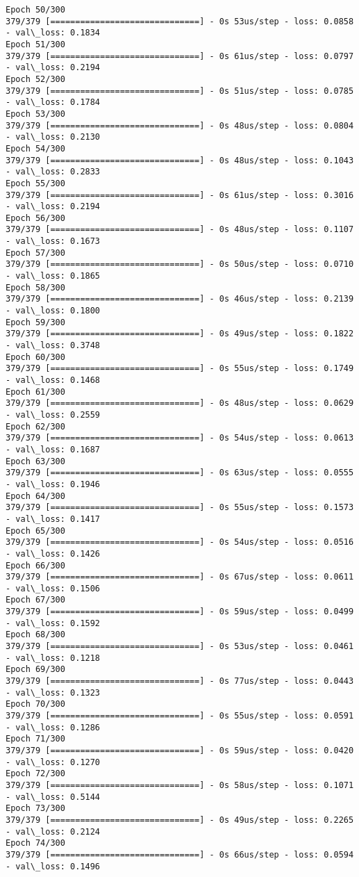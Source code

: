 \documentclass[11pt]{article}
\begin{document}
\begin{Verbatim}[commandchars=\\\{\}]
Epoch 50/300
379/379 [==============================] - 0s 53us/step - loss: 0.0858 - val\_loss: 0.1834
Epoch 51/300
379/379 [==============================] - 0s 61us/step - loss: 0.0797 - val\_loss: 0.2194
Epoch 52/300
379/379 [==============================] - 0s 51us/step - loss: 0.0785 - val\_loss: 0.1784
Epoch 53/300
379/379 [==============================] - 0s 48us/step - loss: 0.0804 - val\_loss: 0.2130
Epoch 54/300
379/379 [==============================] - 0s 48us/step - loss: 0.1043 - val\_loss: 0.2833
Epoch 55/300
379/379 [==============================] - 0s 61us/step - loss: 0.3016 - val\_loss: 0.2194
Epoch 56/300
379/379 [==============================] - 0s 48us/step - loss: 0.1107 - val\_loss: 0.1673
Epoch 57/300
379/379 [==============================] - 0s 50us/step - loss: 0.0710 - val\_loss: 0.1865
Epoch 58/300
379/379 [==============================] - 0s 46us/step - loss: 0.2139 - val\_loss: 0.1800
Epoch 59/300
379/379 [==============================] - 0s 49us/step - loss: 0.1822 - val\_loss: 0.3748
Epoch 60/300
379/379 [==============================] - 0s 55us/step - loss: 0.1749 - val\_loss: 0.1468
Epoch 61/300
379/379 [==============================] - 0s 48us/step - loss: 0.0629 - val\_loss: 0.2559
Epoch 62/300
379/379 [==============================] - 0s 54us/step - loss: 0.0613 - val\_loss: 0.1687
Epoch 63/300
379/379 [==============================] - 0s 63us/step - loss: 0.0555 - val\_loss: 0.1946
Epoch 64/300
379/379 [==============================] - 0s 55us/step - loss: 0.1573 - val\_loss: 0.1417
Epoch 65/300
379/379 [==============================] - 0s 54us/step - loss: 0.0516 - val\_loss: 0.1426
Epoch 66/300
379/379 [==============================] - 0s 67us/step - loss: 0.0611 - val\_loss: 0.1506
Epoch 67/300
379/379 [==============================] - 0s 59us/step - loss: 0.0499 - val\_loss: 0.1592
Epoch 68/300
379/379 [==============================] - 0s 53us/step - loss: 0.0461 - val\_loss: 0.1218
Epoch 69/300
379/379 [==============================] - 0s 77us/step - loss: 0.0443 - val\_loss: 0.1323
Epoch 70/300
379/379 [==============================] - 0s 55us/step - loss: 0.0591 - val\_loss: 0.1286
Epoch 71/300
379/379 [==============================] - 0s 59us/step - loss: 0.0420 - val\_loss: 0.1270
Epoch 72/300
379/379 [==============================] - 0s 58us/step - loss: 0.1071 - val\_loss: 0.5144
Epoch 73/300
379/379 [==============================] - 0s 49us/step - loss: 0.2265 - val\_loss: 0.2124
Epoch 74/300
379/379 [==============================] - 0s 66us/step - loss: 0.0594 - val\_loss: 0.1496

\end{Verbatim}
\end{document}

